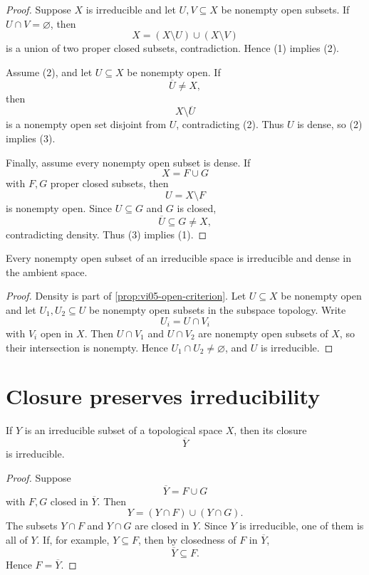 \begin{proof}
Suppose \(X\) is irreducible and let \(U,V\subseteq X\) be nonempty open subsets.  If
\(U\cap V=\varnothing\), then
\[
X=(X\setminus U)\cup(X\setminus V)
\]
is a union of two proper closed subsets, contradiction.  Hence (1) implies (2).

Assume (2), and let \(U\subseteq X\) be nonempty open.  If
\[
\overline U\neq X,
\]
then
\[
X\setminus\overline U
\]
is a nonempty open set disjoint from \(U\), contradicting (2).  Thus \(U\) is dense, so
(2) implies (3).

Finally, assume every nonempty open subset is dense.  If
\[
X=F\cup G
\]
with \(F,G\) proper closed subsets, then
\[
U=X\setminus F
\]
is nonempty open.  Since \(U\subseteq G\) and \(G\) is closed,
\[
\overline U\subseteq G\neq X,
\]
contradicting density.  Thus (3) implies (1).
\end{proof}

\begin{corollary}
\label{cor:vi05-nonempty-open-irreducible}
Every nonempty open subset of an irreducible space is irreducible and dense in the ambient
space.
\end{corollary}

\begin{proof}
Density is part of \cref{prop:vi05-open-criterion}.  Let \(U\subseteq X\) be nonempty
open and let \(U_1,U_2\subseteq U\) be nonempty open subsets in the subspace topology.
Write
\[
U_i=U\cap V_i
\]
with \(V_i\) open in \(X\).  Then \(U\cap V_1\) and \(U\cap V_2\) are nonempty open
subsets of \(X\), so their intersection is nonempty.  Hence \(U_1\cap U_2\neq\varnothing\),
and \(U\) is irreducible.
\end{proof}

\section{Closure preserves irreducibility}

\begin{proposition}
\label{prop:vi05-closure-irreducible}
If \(Y\) is an irreducible subset of a topological space \(X\), then its closure
\[
\overline Y
\]
is irreducible.
\end{proposition}

\begin{proof}
Suppose
\[
\overline Y=F\cup G
\]
with \(F,G\) closed in \(\overline Y\).  Then
\[
Y=(Y\cap F)\cup(Y\cap G).
\]
The subsets \(Y\cap F\) and \(Y\cap G\) are closed in \(Y\).  Since \(Y\) is irreducible,
one of them is all of \(Y\).  If, for example, \(Y\subseteq F\), then by closedness of
\(F\) in \(\overline Y\),
\[
\overline Y\subseteq F.
\]
Hence \(F=\overline Y\).
\end{proof}

